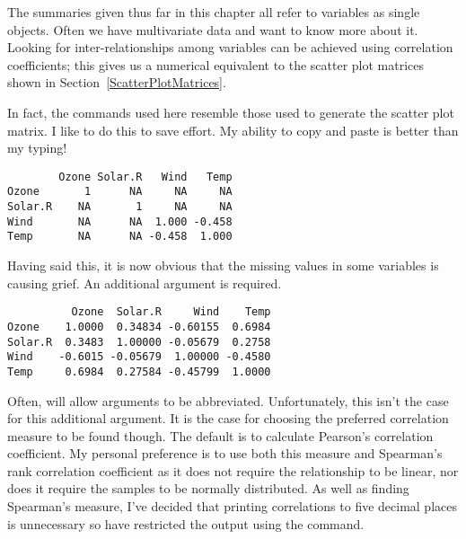 The summaries given thus far in this chapter all refer to variables as single objects. Often we have multivariate data and want to know more about it. Looking for inter-relationships among variables can be achieved using correlation coefficients; this gives us a numerical equivalent to the scatter plot matrices shown in Section~\ref{ScatterPlotMatrices}. 
 
In fact, the commands used here resemble those used to generate the scatter plot matrix. I like to do this to save effort. My ability to copy and paste is better than my typing! 
\begin{knitrout}
\color{fgcolor}\begin{kframe}
\begin{alltt}
\hlstd{> }\hlstd{(}
\end{alltt}
\begin{verbatim}
        Ozone Solar.R   Wind   Temp
Ozone       1      NA     NA     NA
Solar.R    NA       1     NA     NA
Wind       NA      NA  1.000 -0.458
Temp       NA      NA -0.458  1.000
\end{verbatim}
\end{kframe}
\end{knitrout}
Having said this, it is now obvious that the missing values in some variables is causing grief. An additional argument is required. 
\begin{knitrout}
\color{fgcolor}\begin{kframe}
\begin{alltt}
\hlstd{> }\hlstd{(}
\hlstd{   } \hlstd{=} \hlstd{)}
\end{alltt}
\begin{verbatim}
          Ozone  Solar.R     Wind    Temp
Ozone    1.0000  0.34834 -0.60155  0.6984
Solar.R  0.3483  1.00000 -0.05679  0.2758
Wind    -0.6015 -0.05679  1.00000 -0.4580
Temp     0.6984  0.27584 -0.45799  1.0000
\end{verbatim}
\end{kframe}
\end{knitrout}
Often, \R{} will allow arguments to be abbreviated. Unfortunately, this isn't the case for this additional argument. It is the case for choosing the preferred correlation measure to be found though. The default is to calculate Pearson's correlation coefficient. My personal preference is to use both this measure and Spearman's rank correlation coefficient as it does not require the relationship to be linear, nor does it require the samples to be normally distributed. As well as finding Spearman's measure, I've decided that printing correlations to five decimal places is unnecessary so have restricted the output using the  command. 
